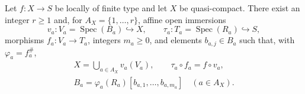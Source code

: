 \begin{lemma}
  \label{lemma:nagata-finite-affine-presentation-locally-finite-type}

  Let $f\colon X\to S$ be locally of finite type and let $X$ be
  quasi-compact.  There exist an integer $r\geq1$ and, for
  $A_X=\{1,\ldots,r\}$, affine open immersions
  \[
    v_a\colon V_a=\operatorname{Spec}(B_a)\hookrightarrow X,
    \qquad
    \tau_a\colon T_a=\operatorname{Spec}(R_a)\hookrightarrow S,
  \]
  morphisms $f_a\colon V_a\to T_a$, integers $m_a\geq0$, and elements
  $b_{a,j}\in B_a$ such that, with $\varphi_a=f_a^\#$,
  \[
  \begin{gathered}
    X=\bigcup_{a\in A_X}v_a(V_a),\qquad
    \tau_a\circ f_a=f\circ v_a,\\
    B_a=\varphi_a(R_a)[b_{a,1},\ldots,b_{a,m_a}]
      \quad(a\in A_X).
  \end{gathered}
  \]
\end{lemma}

